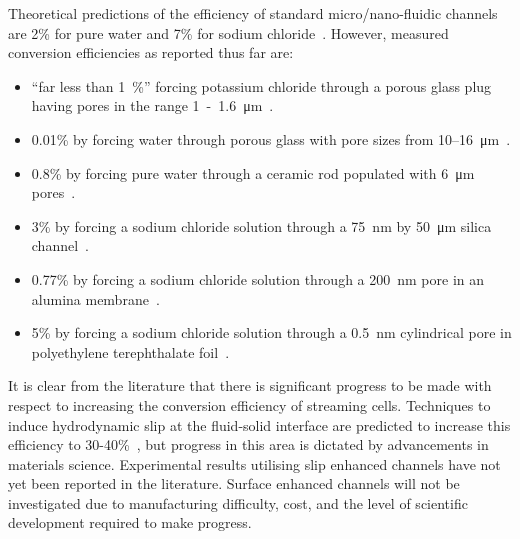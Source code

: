     Theoretical predictions of the efficiency of standard micro/nano-fluidic channels are 2\% for pure water and 7\% for sodium chloride~\cite{VanderHeyden2006}.
    However, measured conversion efficiencies as reported thus far are:
    \begin{itemize}
      \item ``far less than \SI{1}{\percent}'' forcing potassium chloride through a porous glass plug having pores in the range \SI{1}-\SI{1.6}{\micro\meter}~\cite{Olthuis2005}.
      \item 0.01\% by forcing water through porous glass with pore sizes from 10\thinspace--\SI{16}{\micro\metre}~\cite{Yang2003}.
      \item 0.8\% by forcing pure water through a ceramic rod populated with \SI{6}{\micro\metre} pores~\cite{Yang2004}.
      \item 3\% by forcing a sodium chloride solution through a \SI{75}{\nano\metre} by \SI{50}{\micro\metre} silica channel~\cite{Heyden2007}.
      \item 0.77\% by forcing a sodium chloride solution through a \SI{200}{\nano\metre} pore in an alumina membrane~\cite{Lu2006}.
      \item 5\% by forcing a sodium chloride solution through a \SI{0.5}{\nano\metre} cylindrical pore in polyethylene terephthalate foil~\cite{Xie2008}.
    \end{itemize}
    It is clear from the literature that there is significant progress to be made with respect to increasing the conversion efficiency of streaming cells.
    Techniques to induce hydrodynamic slip at the fluid-solid interface are predicted to increase this efficiency to 30-40\%~\cite{Davidson2008a, Ren2008}, but progress in this area is dictated by advancements in materials science.
    Experimental results utilising slip enhanced channels have not yet been reported in the literature.
    Surface enhanced channels will not be investigated due to manufacturing difficulty, cost, and the level of scientific development required to make progress.


